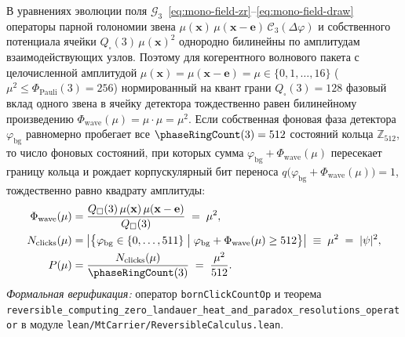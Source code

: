 \begin{theorem}[Детерминированный вывод правила Борна $P(\mu) = \mu^2 / 512$ из билинейности оператора голономии $\mathcal{G}_3$]
\label{thm:mono-born-rule}
В уравнениях эволюции поля $\mathcal{G}_3$~\eqref{eq:mono-field-zr}--\eqref{eq:mono-field-draw} операторы парной голономии звена $\mu(\mathbf{x})\,\mu(\mathbf{x}-\mathbf{e})\,\mathcal{C}_3(\Delta\varphi)$ и собственного потенциала ячейки $Q_\square(3)\,\mu(\mathbf{x})^2$ однородно билинейны по амплитудам взаимодействующих узлов. Поэтому для когерентного волнового пакета с целочисленной амплитудой $\mu(\mathbf{x}) = \mu(\mathbf{x}-\mathbf{e}) = \mu \in \{0, 1, \dots, 16\}$ ($\mu^2 \le \Phi_{\mathrm{Pauli}}(3) = 256$) нормированный на квант грани $Q_\square(3) = 128$ фазовый вклад одного звена в ячейку детектора тождественно равен билинейному произведению $\Phi_{\mathrm{wave}}(\mu) = \mu \cdot \mu = \mu^2$. Если собственная фоновая фаза детектора $\varphi_{\mathrm{bg}}$ равномерно пробегает все $\phaseRingCount(3) = 512$ состояний кольца $\mathbb{Z}_{512}$, то число фоновых состояний, при которых сумма $\varphi_{\mathrm{bg}} + \Phi_{\mathrm{wave}}(\mu)$ пересекает границу кольца и рождает корпускулярный бит переноса $q\bigl(\varphi_{\mathrm{bg}} + \Phi_{\mathrm{wave}}(\mu)\bigr) = 1$, тождественно равно квадрату амплитуды:
\begin{align}
  \Phi_{\mathrm{wave}}(\mu) &= \frac{Q_\square(3)\,\mu(\mathbf{x})\,\mu(\mathbf{x}-\mathbf{e})}{Q_\square(3)} \;=\; \mu^2, \label{eq:mono-born-bilinear} \\
  N_{\mathrm{clicks}}(\mu) &= \bigl|\bigl\{\varphi_{\mathrm{bg}} \in \{0,\dots,511\} \;\big|\; \varphi_{\mathrm{bg}} + \Phi_{\mathrm{wave}}(\mu) \ge 512\bigr\}\bigr| \;\equiv\; \mu^2 \;=\; |\psi|^2, \label{eq:mono-born-exact} \\
  P(\mu) &= \frac{N_{\mathrm{clicks}}(\mu)}{\phaseRingCount(3)} \;=\; \frac{\mu^2}{512}. \label{eq:mono-born-prob}
\end{align}
\emph{Формальная верификация:} оператор \texttt{born\allowbreak Click\allowbreak CountOp} и теорема \texttt{reversible\_\allowbreak computing\_\allowbreak zero\_\allowbreak landauer\_\allowbreak heat\_\allowbreak and\_\allowbreak paradox\_\allowbreak resolutions\_\allowbreak operator} в модуле \texttt{lean/\allowbreak Mt\allowbreak Carrier/\allowbreak Rever\allowbreak sible\allowbreak Calculus.lean}.
\end{theorem}

